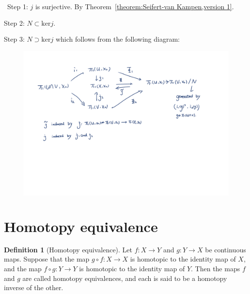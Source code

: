 \documentclass[12pt,a4paper]{book}
\newenvironment{prooff}{{\noindent\it\textcolor{cyan!40!black}{Proof}:}\,}{\par}
\theoremstyle{definition}
\newtheorem{defn}{Definition}[section]
\begin{document}
\begin{prooff}
    Step 1: $j$ is surjective. By Theorem~\ref{theorem:Seifert-van Kampen,version 1}.

    Step 2: $N \subset \text{ker}j$.

    Step 3: $N \supset \text{ker}j$ which follows from the following diagram:
    \begin{figure}[H]
        \includegraphics[scale=0.1]{vankampen2.png}
        \centering
    \end{figure}
\end{prooff}







\newpage
\section{Homotopy equivalence}
\begin{defn}[Homotopy equivalence]
    Let $f: X \rightarrow Y$ and $g: Y \rightarrow X$ be continuous maps. Suppose that the map $g \circ f: X \rightarrow X$ is homotopic to the identity map of $X$, and the map $f \circ g: Y \rightarrow Y$ is homotopic to the identity map of $Y$. Then the maps $f$ and $g$ are called homotopy equivalences, and each is said to be a homotopy inverse of the other.
\end{defn}
\end{document}
